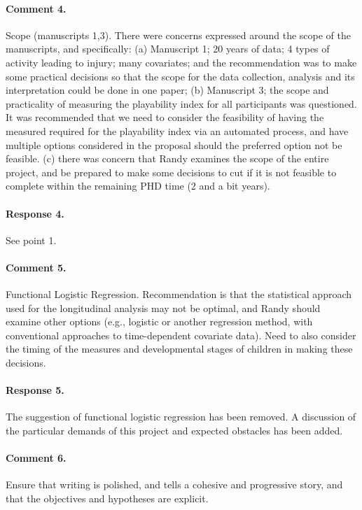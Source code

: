 \documentclass [11pt]{article}
\begin{document}
\paragraph{Comment 4.}Scope (manuscripts 1,3).  There were concerns expressed around the scope of the manuscripts, and specifically: (a) Manuscript 1;  20 years of data; 4 types of activity leading to injury; many covariates; and the recommendation was to make some practical decisions so that the scope for the data collection, analysis and its interpretation could be done in one paper;  (b) Manuscript 3;  the scope and practicality of measuring the playability index for all participants was questioned.  It was recommended that we need to consider the feasibility of having the measured required for the playability index via an automated process, and have multiple options considered in the proposal should the preferred option not be feasible.  (c) there was concern that Randy examines the scope of the entire project, and be prepared to make some decisions to cut if it is not feasible to complete within the remaining PHD time (2 and a bit years).

\paragraph{Response 4.}See point 1.

\paragraph{Comment 5.}Functional Logistic Regression.  Recommendation is that the statistical approach used for the longitudinal analysis may not be optimal, and Randy should examine other options (e.g., logistic or another regression method, with conventional approaches to time-dependent covariate data).  Need to also consider the timing of the measures and developmental stages of children in making these decisions.

\paragraph{Response 5.}The suggestion of functional logistic regression has been removed. A discussion of the particular demands of this project and expected obstacles has been added.

\paragraph{Comment 6.}Ensure that writing is polished, and tells a cohesive and progressive story, and that the objectives and hypotheses are explicit.
\end{document}
